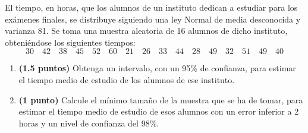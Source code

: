 
El tiempo, en horas, que los alumnos de un instituto dedican a estudiar
para los exámenes finales, se distribuye siguiendo una ley Normal de media
desconocida y varianza 81. Se toma una muestra aleatoria de 16 alumnos de dicho
instituto, obteniéndose los siguientes tiempos:
\[
30\quad42\quad38\quad45\quad52\quad60\quad21\quad26\quad
33\quad44\quad28\quad49\quad32\quad51\quad49\quad40
\]
\begin{enumerate}[label=\alph*)]
  \item \textbf{(1.5 puntos)} Obtenga un intervalo, con un 95\% de confianza,
  para estimar el tiempo medio de estudio de los alumnos de ese instituto.
  \item \textbf{(1 punto)} Calcule el mínimo tamaño de la muestra que se ha
  de tomar, para estimar el tiempo medio de estudio de esos alumnos con un
  error inferior a 2 horas y un nivel de confianza del 98\%.
\end{enumerate}
